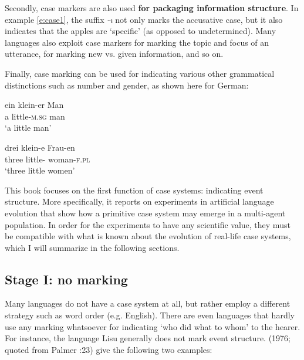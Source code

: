 Secondly, case markers are also used {\bfseries for packaging information structure}. In example \ref{e:case1}, the suffix {\em -ı} not only marks the accusative case, but it also indicates that the apples are `specific' (as opposed to undetermined). Many languages also exploit case markers for marking the topic and focus of an utterance, for marking new vs. given information, and so on.

Finally, case marking can be used for indicating various other grammatical distinctions such as number and gender, as shown here for German:

\ea
\gll ein klein-er Man \\
a little-\textsc{m.sg} man \\
\glt `a little man' \\
\z

\ea
\gll drei klein-e Frau-en \\ 
three little-{\pl} woman-\textsc{f.pl} \\
\glt `three little women' \\
\z

This book focuses on the first function of case systems: indicating event structure. More specifically, it reports on experiments in artificial language evolution that show how a primitive case system may emerge in a multi-agent population. In order for the experiments to have any scientific value, they must be compatible with what is known about the evolution of real-life case systems, which I will summarize in the following sections.

\subsection{Stage I: no marking}
\label{s:stage1}

Many languages do not have a case system at all, but rather employ a different strategy such as word order (e.g. English). There are even languages that hardly use any marking whatsoever for indicating `who did what to whom' to the hearer. For instance, the language Lisu generally does not mark event structure. \citeauthor{li76subject} (1976; quoted from Palmer \citeyear{palmer94grammatical}:23) give the following two examples:

\eal
{}
\zl

